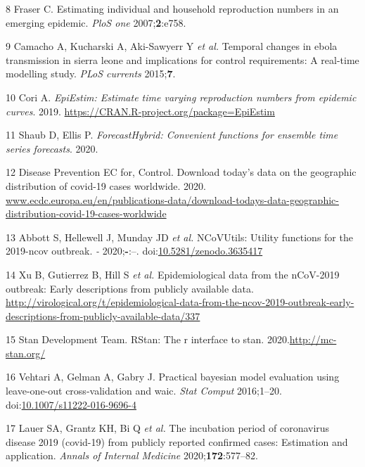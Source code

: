 \documentclass[]{article}
\begin{document}
\leavevmode\hypertarget{ref-Fraser:2007hf}{}%
8 Fraser C. Estimating individual and household reproduction numbers in
an emerging epidemic. \emph{PloS one} 2007;\textbf{2}:e758.

\leavevmode\hypertarget{ref-Camacho:2015dv}{}%
9 Camacho A, Kucharski A, Aki-Sawyerr Y \emph{et al.} Temporal changes
in ebola transmission in sierra leone and implications for control
requirements: A real-time modelling study. \emph{PLoS currents}
2015;\textbf{7}.

\leavevmode\hypertarget{ref-EpiEstim}{}%
10 Cori A. \emph{EpiEstim: Estimate time varying reproduction numbers
from epidemic curves}. 2019.
\url{https://CRAN.R-project.org/package=EpiEstim}

\leavevmode\hypertarget{ref-forecastHybrid}{}%
11 Shaub D, Ellis P. \emph{ForecastHybrid: Convenient functions for
ensemble time series forecasts}. 2020.

\leavevmode\hypertarget{ref-ecdc_data}{}%
12 Disease Prevention EC for, Control. Download today's data on the
geographic distribution of covid-19 cases worldwide. 2020.
\url{www.ecdc.europa.eu/en/publications-data/download-todays-data-geographic-distribution-covid-19-cases-worldwide}

\leavevmode\hypertarget{ref-NCoVUtils}{}%
13 Abbott S, Hellewell J, Munday JD \emph{et al.} NCoVUtils: Utility
functions for the 2019-ncov outbreak. \emph{-} 2020;\textbf{-}:--.
doi:\href{https://doi.org/10.5281/zenodo.3635417}{10.5281/zenodo.3635417}

\leavevmode\hypertarget{ref-kraemer2020epidemiological}{}%
14 Xu B, Gutierrez B, Hill S \emph{et al.} Epidemiological data from the
nCoV-2019 outbreak: Early descriptions from publicly available data.
\url{http://virological.org/t/epidemiological-data-from-the-ncov-2019-outbreak-early-descriptions-from-publicly-available-data/337}

\leavevmode\hypertarget{ref-rstan}{}%
15 Stan Development Team. RStan: The r interface to stan.
2020.\url{http://mc-stan.org/}

\leavevmode\hypertarget{ref-Vehtari2016}{}%
16 Vehtari A, Gelman A, Gabry J. Practical bayesian model evaluation
using leave-one-out cross-validation and waic. \emph{Stat Comput}
2016;1--20.
doi:\href{https://doi.org/10.1007/s11222-016-9696-4}{10.1007/s11222-016-9696-4}

\leavevmode\hypertarget{ref-incubationperiod}{}%
17 Lauer SA, Grantz KH, Bi Q \emph{et al.} The incubation period of
coronavirus disease 2019 (covid-19) from publicly reported confirmed
cases: Estimation and application. \emph{Annals of Internal Medicine}
2020;\textbf{172}:577--82.
\end{document}
